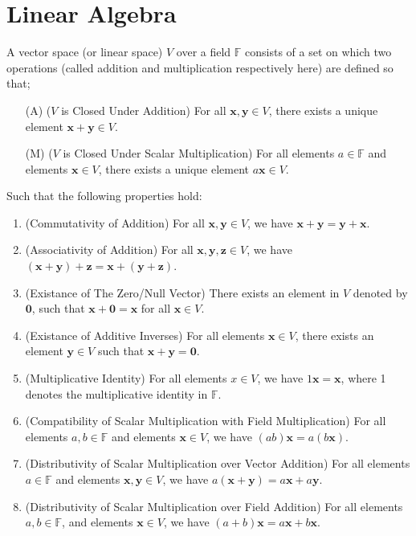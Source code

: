 \documentclass[../Notes.tex]{subfiles}
\begin{document}
\chapter{Linear Algebra}
\begin{definition}{}{}
    A vector space (or linear space) \(V\) over a field \(\mathbb{F}\) consists of a set on which two operations (called addition and multiplication respectively here) are defined so that;
\begin{itemize}[label=(M1),leftmargin=*]
    \item[(A)](\(V\) is Closed Under Addition) For all \(\mathbf{x},\mathbf{y} \in V\), there exists a unique element \(\mathbf{x}+\mathbf{y} \in V\).
    \item[(M)](\(V\) is Closed Under Scalar Multiplication) For all elements \(a \in \mathbb{F}\) and elements \(\mathbf{x} \in V\), there exists a unique element \(a\mathbf{x} \in V\).
\end{itemize}
Such that the following properties hold:  
\begin{enumerate}[label=(VS {{\arabic*}}), leftmargin=*]
    \item \label{(VS 1)}(Commutativity of Addition) For all \(\mathbf{x},\mathbf{y} \in V\), we have \(\mathbf{x}+\mathbf{y}=\mathbf{y}+\mathbf{x}\).
    \item \label{(VS 2)}(Associativity of Addition) For all \(\mathbf{x},\mathbf{y},\mathbf{z} \in V\), we have \((\mathbf{x}+\mathbf{y})+\mathbf{z}=\mathbf{x}+(\mathbf{y}+\mathbf{z})\).
    \item \label{(VS 3)}(Existance of The Zero/Null Vector) There exists an element in \(V\) denoted by \({\mathbf{0}}\), such that \(\mathbf{x}+{\mathbf{0}}=\mathbf{x}\) for all \(\mathbf{x} \in V\).
    \item \label{(VS 4)}(Existance of Additive Inverses) For all elements \(\mathbf{x} \in V\), there exists an element \(\mathbf{y} \in V\) such that \(\mathbf{x}+\mathbf{y}={\mathbf{0}}\).
    \item \label{(VS 5)}(Multiplicative Identity) For all elements \(x \in V\), we have \(1\mathbf{x}=\mathbf{x}\), where 1 denotes the multiplicative identity in \(\mathbb{F}\).
    \item \label{(VS 6)}(Compatibility of Scalar Multiplication with Field Multiplication) For all elements \(a,b \in \mathbb{F}\) and elements \(\mathbf{x} \in V\), we have \((ab)\mathbf{x}=a(b\mathbf{x})\).
    \item \label{(VS 7)}(Distributivity of Scalar Multiplication over Vector Addition) For all elements \(a \in \mathbb{F}\) and elements \(\mathbf{x},\mathbf{y} \in V\), we have \(a(\mathbf{x}+\mathbf{y})=a\mathbf{x}+a\mathbf{y}\).
    \item \label{(VS 8)}(Distributivity of Scalar Multiplication over Field Addition) For all elements \(a,b \in \mathbb{F}\), and elements \(\mathbf{x} \in V\), we have \((a+b)\mathbf{x}=a\mathbf{x}+b\mathbf{x}\).
\end{enumerate}
\end{definition}
\end{document}
